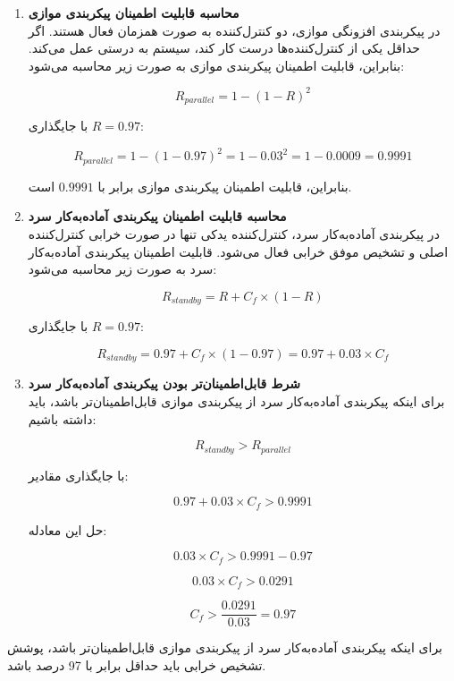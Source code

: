 \begin{qsolve}
	\begin{enumerate}
		\item 
		\textbf{محاسبه قابلیت اطمینان پیکربندی موازی}\\
		
		در پیکربندی افزونگی موازی، دو کنترل‌کننده به صورت همزمان فعال هستند. اگر حداقل یکی از کنترل‌کننده‌ها درست کار کند، سیستم به درستی عمل می‌کند. بنابراین، قابلیت اطمینان پیکربندی موازی به صورت زیر محاسبه می‌شود:
		
		
		\[
		R_{parallel} = 1 - (1 - R)^2
		\]
		
		با جایگذاری $R = 0.97$:
		
		\[
		R_{parallel} = 1 - (1 - 0.97)^2 = 1 - 0.03^2 = 1 - 0.0009 = 0.9991
		\]
		
		بنابراین، قابلیت اطمینان پیکربندی موازی برابر با $0.9991$ است.
		
		
		
		\item 
		\textbf{محاسبه قابلیت اطمینان پیکربندی آماده‌به‌کار سرد}\\
		
		در پیکربندی آماده‌به‌کار سرد، کنترل‌کننده یدکی تنها در صورت خرابی کنترل‌کننده اصلی و تشخیص موفق خرابی فعال می‌شود. قابلیت اطمینان پیکربندی آماده‌به‌کار سرد به صورت زیر محاسبه می‌شود:
		
		\[
		R_{standby} = R + C_f \times (1 - R)
		\]
		
		با جایگذاری $R = 0.97$:
		
		\[
		R_{standby} = 0.97 + C_f \times (1 - 0.97) = 0.97 + 0.03 \times C_f
		\]
		
		
		\item 
		\textbf{شرط قابل‌اطمینان‌تر بودن پیکربندی آماده‌به‌کار سرد}\\
		
		برای اینکه پیکربندی آماده‌به‌کار سرد از پیکربندی موازی قابل‌اطمینان‌تر باشد، باید داشته باشیم:
		
		\[
		R_{standby} > R_{parallel}
		\]
		
		با جایگذاری مقادیر:
		
		\[
		0.97 + 0.03 \times C_f > 0.9991
		\]
		
		حل این معادله:
		
		\[
		0.03 \times C_f > 0.9991 - 0.97
		\]
		
		\[
		0.03 \times C_f > 0.0291
		\]
		
		\[
		C_f > \frac{0.0291}{0.03} = 0.97
		\]
	\end{enumerate}
\end{qsolve}


\begin{qsolve}
	برای اینکه پیکربندی آماده‌به‌کار سرد از پیکربندی موازی قابل‌اطمینان‌تر باشد، پوشش تشخیص خرابی باید حداقل برابر با 97 درصد باشد.
\end{qsolve}